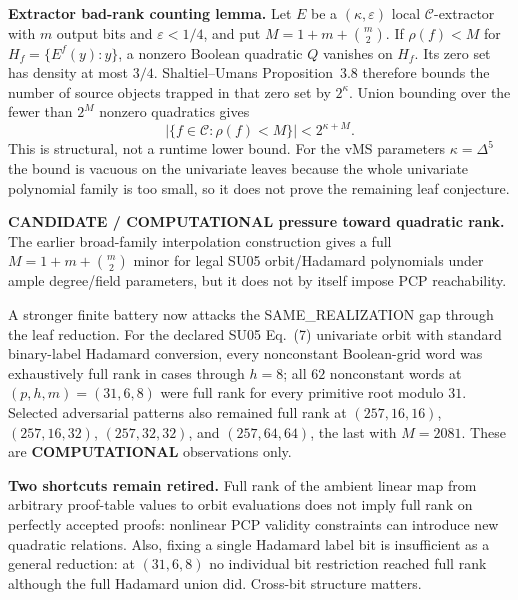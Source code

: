 \documentclass[11pt]{article}
\begin{document}
\begin{provedbox}
\textbf{Extractor bad-rank counting lemma.}
Let $E$ be a $(\kappa,\varepsilon)$ local $\mathcal C$-extractor with $m$ output bits and
$\varepsilon<1/4$, and put $M=1+m+\binom m2$. If $\rho(f)<M$ for
$H_f=\{E^f(y):y\}$, a nonzero Boolean quadratic $Q$ vanishes on $H_f$.
Its zero set has density at most $3/4$. Shaltiel--Umans Proposition~3.8 therefore bounds the
number of source objects trapped in that zero set by $2^\kappa$. Union bounding over the fewer
than $2^M$ nonzero quadratics gives
\[
\boxed{
|\{f\in\mathcal C:\rho(f)<M\}|<2^{\kappa+M}.
}
\]
This is structural, not a runtime lower bound. For the vMS parameters $\kappa=\Delta^5$ the
bound is vacuous on the univariate leaves because the whole univariate polynomial family is too
small, so it does not prove the remaining leaf conjecture.
\end{provedbox}

\begin{candidatebox}
\textbf{CANDIDATE / COMPUTATIONAL pressure toward quadratic rank.}
The earlier broad-family interpolation construction gives a full
$M=1+m+\binom m2$ minor for legal SU05 orbit/Hadamard polynomials under ample degree/field
parameters, but it does not by itself impose PCP reachability.

A stronger finite battery now attacks the SAME\_REALIZATION gap through the leaf reduction.
For the declared SU05 Eq.~(7) univariate orbit with standard binary-label Hadamard conversion,
every nonconstant Boolean-grid word was exhaustively full rank in cases through $h=8$; all
$62$ nonconstant words at $(p,h,m)=(31,6,8)$ were full rank for every primitive root modulo
$31$. Selected adversarial patterns also remained full rank at
$(257,16,16)$, $(257,16,32)$, $(257,32,32)$, and $(257,64,64)$, the last with
$M=2081$. These are \textbf{COMPUTATIONAL} observations only.
\end{candidatebox}

\begin{warningbox}
\textbf{Two shortcuts remain retired.}
Full rank of the ambient linear map from arbitrary proof-table values to orbit evaluations does not
imply full rank on perfectly accepted proofs: nonlinear PCP validity constraints can introduce new
quadratic relations. Also, fixing a single Hadamard label bit is insufficient as a general reduction:
at $(31,6,8)$ no individual bit restriction reached full rank although the full Hadamard union did.
Cross-bit structure matters.
\end{warningbox}
\end{document}

